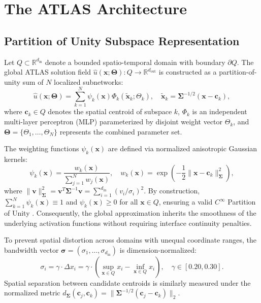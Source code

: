 \documentclass[runningheads]{llncs}
\begin{document}
\section{The ATLAS Architecture}
\label{sec:method}

\subsection{Partition of Unity Subspace Representation}
Let $Q \subset \mathbb{R}^{d_{\text{in}}}$ denote a bounded spatio-temporal domain with boundary $\partial Q$. The global ATLAS solution field $\hat{u}(\mathbf{x}; \boldsymbol{\Theta}): Q \to \mathbb{R}^{d_{\text{out}}}$ is constructed as a partition-of-unity sum of $N$ localized subnetworks:
\begin{equation}
\label{eq:pou_sum}
\hat{u}(\mathbf{x}; \boldsymbol{\Theta}) = \sum_{k=1}^N \psi_k(\mathbf{x}) \Phi_k(\tilde{\mathbf{x}}_k; \Theta_k), \quad \tilde{\mathbf{x}}_k = \boldsymbol{\Sigma}^{-1/2}(\mathbf{x} - \mathbf{c}_k),
\end{equation}
where $\mathbf{c}_k \in Q$ denotes the spatial centroid of subspace $k$, $\Phi_k$ is an independent multi-layer perceptron (MLP) parameterized by disjoint weight vector $\Theta_k$, and $\boldsymbol{\Theta} = \{\Theta_1, \dots, \Theta_N\}$ represents the combined parameter set.

The weighting functions $\psi_k(\mathbf{x})$ are defined via normalized anisotropic Gaussian kernels:
\begin{equation}
\label{eq:pou_weights}
\psi_k(\mathbf{x}) = \frac{w_k(\mathbf{x})}{\sum_{j=1}^N w_j(\mathbf{x})}, \quad w_k(\mathbf{x}) = \exp\left(-\frac{1}{2}\|\mathbf{x} - \mathbf{c}_k\|_{\boldsymbol{\Sigma}}^2\right),
\end{equation}
where $\|\mathbf{v}\|_{\boldsymbol{\Sigma}}^2 = \mathbf{v}^T \boldsymbol{\Sigma}^{-1} \mathbf{v} = \sum_{i=1}^{d_{\text{in}}} (v_i / \sigma_i)^2$. By construction, $\sum_{k=1}^N \psi_k(\mathbf{x}) \equiv 1$ and $\psi_k(\mathbf{x}) \ge 0$ for all $\mathbf{x} \in Q$, ensuring a valid $C^\infty$ Partition of Unity \cite{babuska1997partition}. Consequently, the global approximation inherits the smoothness of the underlying activation functions without requiring interface continuity penalties.

To prevent spatial distortion across domains with unequal coordinate ranges, the bandwidth vector $\boldsymbol{\sigma} = (\sigma_1, \dots, \sigma_{d_{\text{in}}})$ is dimension-normalized:
\begin{equation}
\label{eq:dim_normalized_sigma}
\sigma_i = \gamma \cdot \Delta x_i = \gamma \cdot (\sup_{\mathbf{x} \in Q} x_i - \inf_{\mathbf{x} \in Q} x_i), \quad \gamma \in [0.20, 0.30].
\end{equation}
Spatial separation between candidate centroids is similarly measured under the normalized metric $d_{\boldsymbol{\Sigma}}(\mathbf{c}_j, \mathbf{c}_k) = \|\boldsymbol{\Sigma}^{-1/2}(\mathbf{c}_j - \mathbf{c}_k)\|_2$.
\end{document}
